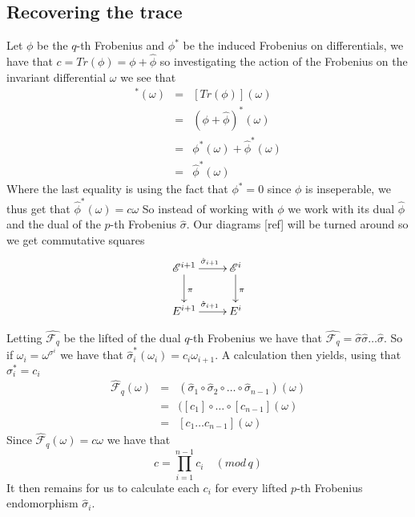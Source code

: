 \subsection{Recovering the trace}
Let $\phi$ be the $q$-th Frobenius and $\phi^*$ be the induced Frobenius on differentials, 
we have that $c = Tr(\phi) = \phi + \hat{\phi}$ so investigating the
action of the Frobenius on the invariant differential $\omega$ we see that
\begin{eqnarray}
 [Tr(\phi)]^*(\omega)&=& [Tr(\phi)](\omega) \nonumber \\
		     &=& (\phi + \hat{\phi})^*(\omega) \nonumber \\
		     &=& \phi^*(\omega) + \hat{\phi}^*(\omega) \nonumber \\
		     &=& \hat{\phi}^*(\omega) \nonumber
\end{eqnarray}
Where the last equality is using the fact that $\phi^* = 0$ since $\phi$ is inseperable, we thus
get that $\hat{\phi}^*(\omega) = c\omega$ 
So instead of working with $\phi$ we work with its dual $\hat{\phi}$ and the dual
of the $p$-th Frobenius $\hat{\sigma}$. Our diagrams [ref] will be turned around so we get commutative
squares
$$
\xymatrix {
  \mathscr{E}^{i+1} \ar[r]^{\hat{\sigma}_{i+1}} \ar[d]^\pi & \mathscr{E}^i \ar[d]^\pi \\
  E^{i+1} \ar[r]^{\hat{\sigma}_{i+1}} & E^i 
}
$$

Letting $\hat{\mathscr{F}_q}$ be the lifted of the dual $q$-th Frobenius we have that
$\hat{\mathscr{F}_q} = \hat{\sigma} \hat{\sigma} \ldots \hat{\sigma}$.
So if $\omega_i = \omega^{\sigma^i}$ we have that $\hat{\sigma}_i^*(\omega_i) = c_i \omega_{i+1}$.
A calculation then yields, using that $\sigma_i^* = c_i$
\begin{eqnarray}
  \hat{\mathscr{F}}_q(\omega) &=& (\hat{\sigma}_1 \circ \hat{\sigma}_2 \circ \ldots \circ \hat{\sigma}_{n-1})(\omega) \nonumber \\
			      &=& ([c_1] \circ \ldots \circ [c_{n-1}](\omega) \nonumber \\
			      &=& [c_1\ldots c_{n-1}](\omega) \nonumber
\end{eqnarray}
Since $\hat{\mathscr{F}}_q(\omega) = c \omega$ we have that
$$ c = \prod_{i=1}^{n-1} c_i \quad (mod\, q) $$
It then remains for us to calculate each $c_i$ for every lifted $p$-th Frobenius
endomorphism $\hat{\sigma}_i$.


